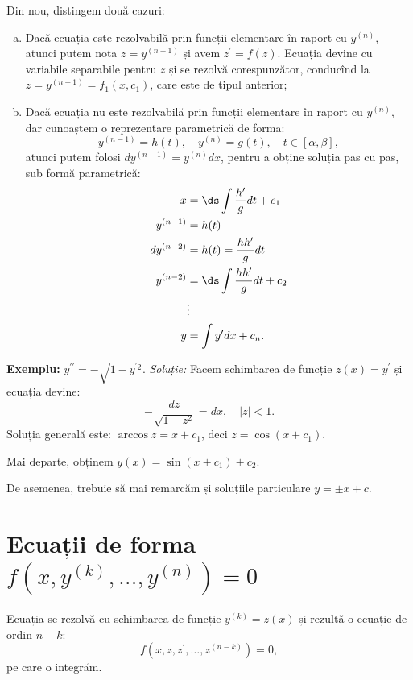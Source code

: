 Din nou, distingem două cazuri:
\begin{enumerate}[(a)]
\item Dacă ecuația este rezolvabilă prin funcții elementare în raport cu $ y^{(n)} $,
  atunci putem nota $ z = y^{(n-1)} $ și avem $ z^{\prime} = f(z) $. Ecuația devine cu
  variabile separabile pentru $ z $ și se rezolvă corespunzător, conducînd la
  $ z = y^{(n-1)} = f_1(x, c_1) $, care este de tipul anterior;
\item Dacă ecuația nu este rezolvabilă prin funcții elementare în raport cu
  $ y^{(n)} $, dar cunoaștem o reprezentare parametrică de forma:
  \[
    y^{(n-1)} = h(t), \quad y^{(n)} = g(t), \quad t \in [\alpha, \beta],
  \]
  atunci putem folosi $ dy^{(n-1)} = y^{(n)} dx $, pentru a obține soluția
  pas cu pas, sub formă parametrică:
  \begin{align*}
    x &= \ds\int\frac{h^{\prime}}{g} dt + c_1 \\
    y^{(n-1)} &= h(t) \\
    dy^{(n-2)} &= h(t) = \dfrac{hh^{\prime}}{g} dt \\
    y^{(n-2)} &= \ds\int \frac{hh^{\prime}}{g} dt + c_2 \\
      &\vdots \\
    y &= \int y^{\prime} dx + c_n.
  \end{align*}

\end{enumerate}

\textbf{Exemplu:} $ y^{\prime\prime} = - \sqrt{1 - y^{^{\prime}2}} $.
\emph{Soluție:} Facem schimbarea de funcție $ z(x) = y^{\prime} $ și ecuația devine:
\[
  - \dfrac{dz}{\sqrt{1 - z^2}} = dx, \quad |z| < 1.
\]
Soluția generală este: $ \arccos z = x + c_1 $, deci $ z = \cos(x + c_1) $.

Mai departe, obținem $ y(x) = \sin(x + c_1) + c_2 $.

De asemenea, trebuie să mai remarcăm și soluțiile particulare $ y = \pm x + c $.


\section{Ecuații de forma $ f(x, y^{(k)}, \dots, y^{(n)}) = 0 $}

Ecuația se rezolvă cu schimbarea de funcție $ y^{(k)} = z(x) $ și rezultă
o ecuație de ordin $ n - k $:
\[
  f(x, z, z^{\prime}, \dots, z^{(n-k)}) = 0,
\]
pe care o integrăm.

